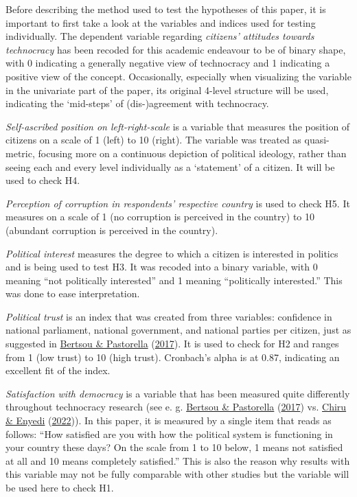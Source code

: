\documentclass[
  12pt,
  english,
]{article}
\begin{document}
Before describing the method used to test the hypotheses of this paper,
it is important to first take a look at the variables and indices used
for testing individually. The dependent variable regarding
\emph{citizens' attitudes towards technocracy} has been recoded for this
academic endeavour to be of binary shape, with 0 indicating a generally
negative view of technocracy and 1 indicating a positive view of the
concept. Occasionally, especially when visualizing the variable in the
univariate part of the paper, its original 4-level structure will be
used, indicating the `mid-steps' of (dis-)agreement with technocracy.

\emph{Self-ascribed position on left-right-scale} is a variable that
measures the position of citizens on a scale of 1 (left) to 10 (right).
The variable was treated as quasi-metric, focusing more on a continuous
depiction of political ideology, rather than seeing each and every level
individually as a `statement' of a citizen. It will be used to check H4.

\emph{Perception of corruption in respondents' respective country} is
used to check H5. It measures on a scale of 1 (no corruption is
perceived in the country) to 10 (abundant corruption is perceived in the
country).

\emph{Political interest} measures the degree to which a citizen is
interested in politics and is being used to test H3. It was recoded into
a binary variable, with 0 meaning ``not politically interested'' and 1
meaning ``politically interested.'' This was done to ease
interpretation.

\emph{Political trust} is an index that was created from three
variables: confidence in national parliament, national government, and
national parties per citizen, just as suggested in
\protect\hyperlink{ref-bertsou2017technocratic}{Bertsou \& Pastorella}
(\protect\hyperlink{ref-bertsou2017technocratic}{2017}). It is used to
check for H2 and ranges from 1 (low trust) to 10 (high trust).
Cronbach's alpha is at 0.87, indicating an excellent fit of the index.

\emph{Satisfaction with democracy} is a variable that has been measured
quite differently throughout technocracy research (see e. g.
\protect\hyperlink{ref-bertsou2017technocratic}{Bertsou \& Pastorella}
(\protect\hyperlink{ref-bertsou2017technocratic}{2017}) vs.
\protect\hyperlink{ref-chiru2022wants}{Chiru \& Enyedi}
(\protect\hyperlink{ref-chiru2022wants}{2022})). In this paper, it is
measured by a single item that reads as follows: ``How satisfied are you
with how the political system is functioning in your country these days?
On the scale from 1 to 10 below, 1 means not satisfied at all and 10
means completely satisfied.'' This is also the reason why results with
this variable may not be fully comparable with other studies but the
variable will be used here to check H1.
\end{document}
